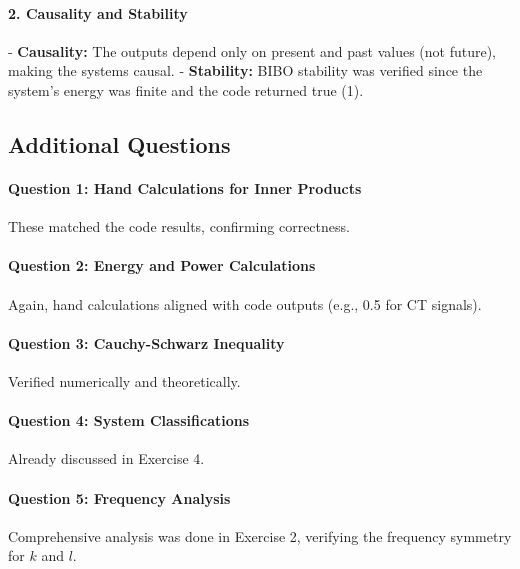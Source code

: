 \documentclass[12pt]{article}
\begin{document}
\paragraph{2. Causality and Stability}
- \textbf{Causality:} The outputs depend only on present and past values (not future), making the systems causal.
- \textbf{Stability:} BIBO stability was verified since the system’s energy was finite and the code returned true (1).

\subsection{Additional Questions}

\paragraph{Question 1: Hand Calculations for Inner Products}
These matched the code results, confirming correctness.

\paragraph{Question 2: Energy and Power Calculations}
Again, hand calculations aligned with code outputs (e.g., 0.5 for CT signals).

\paragraph{Question 3: Cauchy-Schwarz Inequality}
Verified numerically and theoretically.

\paragraph{Question 4: System Classifications}
Already discussed in Exercise 4.

\paragraph{Question 5: Frequency Analysis}
Comprehensive analysis was done in Exercise 2, verifying the frequency symmetry for \(k\) and \(l\).
\end{document}
